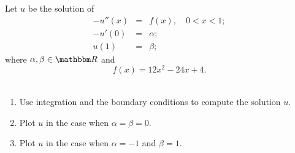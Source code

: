 
Let $u$ be the solution of
\begin{eqnarray*}
-u''(x) &=& f(x),\quad 0<x<1;
\\
-u'(0) &=& \alpha;
\\
u(1) &=& \beta;
\end{eqnarray*}
where $\alpha,\beta\in\R$ and
\[
f(x)=12x^2-24x+4.
\]
\\
\begin{enumerate}
\item Use integration and the boundary conditions to compute the solution $u$.
\\
\item Plot $u$ in the case when $\alpha=\beta=0$.
\\
\item Plot $u$ in the case when $\alpha = -1$ and $\beta = 1$.
\end{enumerate}




